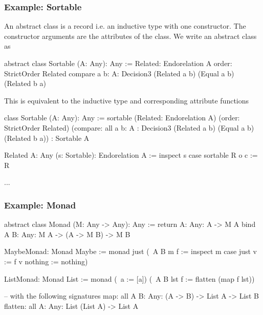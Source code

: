 \subsubsection{Example: Sortable}

An abstract class is a record i.e. an inductive type with one constructor. The
constructor arguments are the attributes of the class. We write an abstract
class as

\begin{alba}
    abstract class
        Sortable (A: Any): Any
    :=
        Related: Endorelation A
        order: StrictOrder Related
        compare {a b: A}: Decision3 (Related a b) (Equal a b) (Related b a)
\end{alba}

This is equivalent to the inductive type and corresponding attribute functions

\begin{alba}
    class
        Sortable (A: Any): Any
    :=
        sortable
            (Related: Endorelation A)
            (order: StrictOrder Related)
            (compare:
                all {a b: A}
                : Decision3 (Related a b) (Equal a b) (Related b a))
            : Sortable A

    Related {A: Any} (s: Sortable): Endorelation A :=
        inspect s case
            sortable R o c := R

    ...
\end{alba}




\subsubsection{Example: Monad}

\begin{alba}
    abstract class
        Monad (M: Any -> Any): Any
    :=
        return {A: Any}: A -> M A
        bind
            {A B: Any}: M A -> (A -> M B) -> M B
\end{alba}


\begin{alba}
    MaybeMonad: Monad Maybe :=
        monad
            just
            (\ {A B} m f :=
                inspect m case
                    just v  := f v
                    nothing := nothing)

    ListMonad: Monad List :=
        monad
            (\ a := [a])
            (\ {A B} lst f :=
                flatten (map f lst))

    -- with the following signatures
    map:
        all {A B: Any}: (A -> B) -> List A -> List B
    flatten:
        all {A: Any}: List (List A) -> List A
\end{alba}
